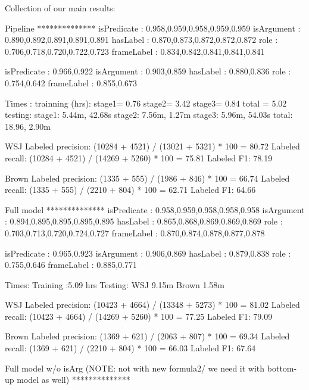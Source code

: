 


Collection of our main results:

Pipeline
**************
         isPredicate    : 0.958,0.959,0.958,0.959,0.959
          isArgument    : 0.890,0.892,0.891,0.891,0.891
            hasLabel    : 0.870,0.873,0.872,0.872,0.872
                role    : 0.706,0.718,0.720,0.722,0.723
          frameLabel    : 0.834,0.842,0.841,0.841,0.841

         isPredicate    : 0.966,0.922
          isArgument    : 0.903,0.859
            hasLabel    : 0.880,0.836
                role    : 0.754,0.642
          frameLabel    : 0.855,0.673

Times :
trainning (hrs):
stage1= 0.76
stage2= 3.42
stage3= 0.84
total = 5.02
testing:
stage1: 5.44m, 42.68s
stage2: 7.56m, 1.27m 
stage3: 5.96m, 54.03s
total: 18.96,  2.90m


WSJ
  Labeled precision:          (10284 + 4521) / (13021 + 5321) * 100 = 80.72 %
  Labeled recall:             (10284 + 4521) / (14269 + 5260) * 100 = 75.81 %
  Labeled F1:                 78.19

Brown
  Labeled precision:          (1335 + 555) / (1986 + 846) * 100 = 66.74 %
  Labeled recall:             (1335 + 555) / (2210 + 804) * 100 = 62.71 %
  Labeled F1:                 64.66



Full model
**************
         isPredicate    : 0.958,0.959,0.958,0.958,0.958
          isArgument    : 0.894,0.895,0.895,0.895,0.895
            hasLabel    : 0.865,0.868,0.869,0.869,0.869
                role    : 0.703,0.713,0.720,0.724,0.727
          frameLabel    : 0.870,0.874,0.878,0.877,0.878

         isPredicate    : 0.965,0.923
          isArgument    : 0.906,0.869
            hasLabel    : 0.879,0.838
                role    : 0.755,0.646
          frameLabel    : 0.885,0.771

Times:
Training :5.09 hrs
Testing:
WSJ          9.15m 
Brown        1.58m 


WSJ
  Labeled precision:          (10423 + 4664) / (13348 + 5273) * 100 = 81.02 %
  Labeled recall:             (10423 + 4664) / (14269 + 5260) * 100 = 77.25 %
  Labeled F1:                 79.09

Brown
  Labeled precision:          (1369 + 621) / (2063 + 807) * 100 = 69.34 %
  Labeled recall:             (1369 + 621) / (2210 + 804) * 100 = 66.03 %
  Labeled F1:                 67.64


Full model w/o isArg (NOTE: not with new formula2/ we need it with bottom-up model as well)
**************


